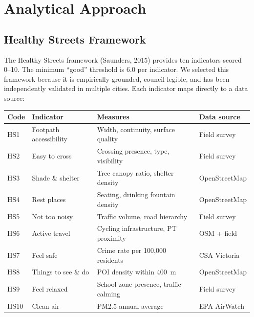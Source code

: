 \documentclass[11pt,a4paper]{article}
\begin{document}
\section{Analytical Approach}

\subsection{Healthy Streets Framework}

The Healthy Streets framework (Saunders, 2015) provides ten indicators scored 0--10. The minimum ``good'' threshold is 6.0 per indicator. We selected this framework because it is empirically grounded, council-legible, and has been independently validated in multiple cities. Each indicator maps directly to a data source:

\vspace{4pt}
\begin{tabularx}{\linewidth}{C{1.0cm} L{3.5cm} L{4.8cm} L{4.5cm}}
\toprule
{}
\color{white}\textbf{Code} & \color{white}\textbf{Indicator} & \color{white}\textbf{Measures} & \color{white}\textbf{Data source} \\
\midrule
{} HS1 & Footpath accessibility & Width, continuity, surface quality & Field survey \\
HS2 & Easy to cross       & Crossing presence, type, visibility & Field survey \\
 HS3 & Shade \& shelter       & Tree canopy ratio, shelter density & OpenStreetMap \\
HS4 & Rest places         & Seating, drinking fountain density & OpenStreetMap \\
 HS5 & Not too noisy         & Traffic volume, road hierarchy     & Field survey \\
HS6 & Active travel       & Cycling infrastructure, PT proximity & OSM + field \\
 HS7 & Feel safe             & Crime rate per 100,000 residents   & CSA Victoria \\
HS8 & Things to see \& do & POI density within 400~m           & OpenStreetMap \\
 HS9 & Feel relaxed          & School zone presence, traffic calming & Field survey \\
HS10 & Clean air          & PM2.5 annual average               & EPA AirWatch \\
\bottomrule
\end{tabularx}
\end{document}
